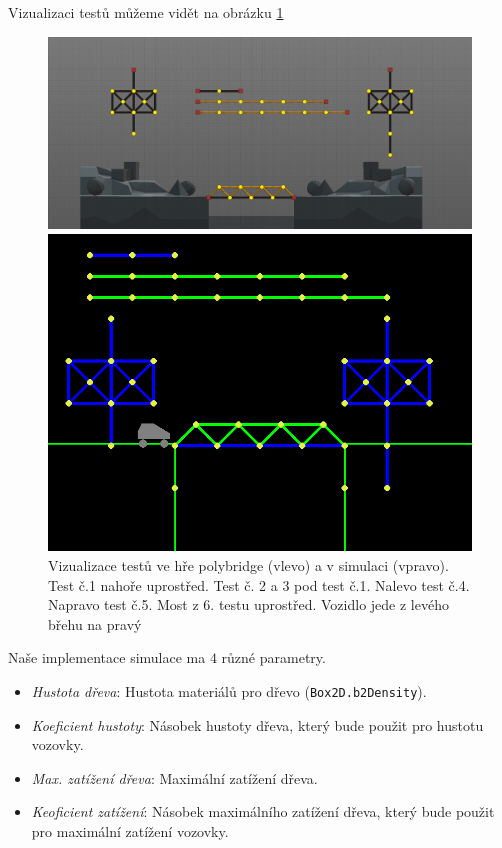 Vizualizaci testů můžeme vidět na obrázku \ref{impl-fig:1}

\begin{figure}[ht]
    \centering
    \begin{minipage}{0.49\textwidth}
        \centering
        \includegraphics[width=\linewidth]{img/poly_tests.png}
    \end{minipage}\hfill
    \begin{minipage}{0.49\textwidth}
        \centering
        \includegraphics[width=\linewidth]{img/sim_tests.png}
    \end{minipage}
    \caption{Vizualizace testů ve hře polybridge (vlevo) a v simulaci (vpravo). Test č.1 nahoře uprostřed. Test č. 2 a 3 pod test č.1. Nalevo test č.4. Napravo test č.5. Most z 6. testu uprostřed. Vozidlo jede z levého břehu na pravý}
    \label{impl-fig:1}
\end{figure}

Naše implementace simulace ma $4$ různé parametry.
\begin{itemize}
    \item \emph{Hustota dřeva}: Hustota materiálů pro dřevo (\texttt{Box2D.b2Density}).
    \item \emph{Koeficient hustoty}: Násobek hustoty dřeva, který bude použit pro hustotu vozovky.
    \item \emph{Max. zatížení dřeva}: Maximální zatížení dřeva.
    \item \emph{Keoficient zatížení}: Násobek maximálního zatížení dřeva, který bude použit pro maximální zatížení vozovky.
\end{itemize}

